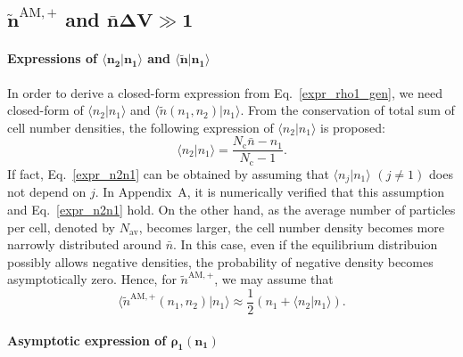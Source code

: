 \documentclass{article}
\newcommand{\dV}{{\Delta V}}
\newcommand{\Nc}{{N_\mathrm{c}}}
\newcommand{\nb}{\bar{n}}
\newcommand{\Nav}{{N_\mathrm{av}}}
\begin{document}
\subsection{\label{subsec_main_res_AMNav}$\bm{\tilde{n}^{\mathrm{AM},+}}$ and $\bm{\nb\dV\gg 1}$}

\paragraph{Expressions of $\bm{\langle n_2|n_1\rangle}$ and $\bm{\langle\tilde{n}|n_1\rangle}$}

In order to derive a closed-form expression from Eq.~\eqref{expr_rho1_gen}, we need closed-form of $\langle n_2|n_1\rangle$ and $\langle\tilde{n}(n_1,n_2)|n_1\rangle$.
From the conservation of total sum of cell number densities, the following expression of $\langle n_2|n_1\rangle$ is proposed:
\begin{equation}
\label{expr_n2n1}
\langle n_2|n_1\rangle = \frac{\Nc\nb-n_1}{\Nc-1}.
\end{equation}
If fact, Eq.~\eqref{expr_n2n1} can be obtained by assuming that $\langle n_j|n_1\rangle$ $(j\ne1)$ does not depend on $j$.
In Appendix~A, it is numerically verified that this assumption and Eq.~\eqref{expr_n2n1} hold.
On the other hand, as the average number of particles per cell, denoted by $\Nav$, becomes larger, the cell number density becomes more narrowly distributed around $\nb$.
In this case, even if the equilibrium distribuion possibly allows negative densities, the probability of negative density becomes asymptotically zero.
Hence, for $\tilde{n}^{\mathrm{AM},+}$, we may assume that 
\begin{equation}
\label{expr_ntilden1}
\langle\tilde{n}^{\mathrm{AM},+}(n_1,n_2)|n_1\rangle\approx
\frac12\left(n_1+\langle n_2|n_1\rangle\right).
\end{equation}

\paragraph{Asymptotic expression of $\bm{\rho_1(n_1)}$}
\end{document}
